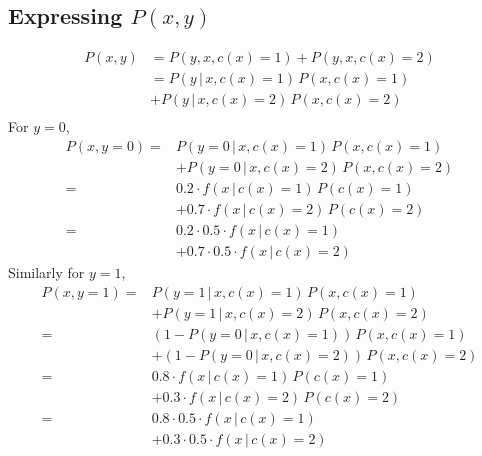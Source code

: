 \documentclass[9pt,twocolumn]{article}
\begin{document}
\subsection*{Expressing $P(x,y)$}
\begin{equation*}
\begin{split}
P(x,y)&=P(y,x,c(x)=1)+P(y,x,c(x)=2)\\
      &=P(y\,|\,x,c(x)=1)\,P(x,c(x)=1)\\
	  &+P(y\,|\,x,c(x)=2)\,P(x,c(x)=2)\\
\end{split}
\end{equation*}
For $y=0$,
\begin{equation*}
\begin{split}
	P(x,y=0) = & P(y=0\,|\,x,c(x)=1)\,P(x,c(x)=1)\\
	  &+P(y=0\,|\,x,c(x)=2)\,P(x,c(x)=2)\\
	= & 0.2 \cdot f(x\,|\,c(x)=1)\,P(c(x)=1)\\
	& + 0.7 \cdot f(x\,|\,c(x)=2)\,P(c(x)=2)\\
		= & 0.2 \cdot 0.5 \cdot f(x\,|\,c(x)=1)\\
	& + 0.7 \cdot 0.5 \cdot f(x\,|\,c(x)=2)
\end{split}
\end{equation*}
Similarly for $y=1$,
\begin{equation*}
\begin{split}
	P(x,y=1)=&P(y=1\,|\,x,c(x)=1)\,P(x,c(x)=1)\\
	  &+P(y=1\,|\,x,c(x)=2)\,P(x,c(x)=2)\\
     =&(1-P(y=0\,|\,x,c(x)=1))\,P(x,c(x)=1)\\
     &+(1-P(y=0\,|\,x,c(x)=2))\,P(x,c(x)=2)\\
	= & 0.8 \cdot f(x\,|\,c(x)=1)\,P(c(x)=1)\\
	& + 0.3 \cdot f(x\,|\,c(x)=2)\,P(c(x)=2)\\
	= & 0.8 \cdot 0.5 \cdot f(x\,|\,c(x)=1)\\
	& + 0.3 \cdot 0.5 \cdot f(x\,|\,c(x)=2)
\end{split}
\end{equation*}
\end{document}
